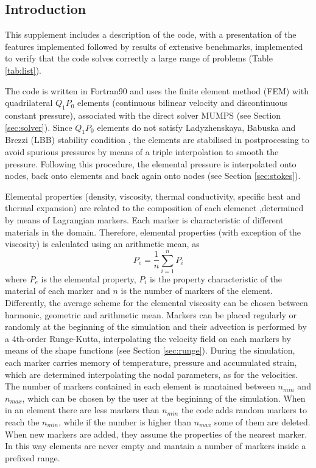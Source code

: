 \documentclass[draft,tec]{agutexSI2019}
\begin{document}
\begin{article}

\section{Introduction}\label{sec:intro}

This supplement includes a description of the code, with a presentation of the features implemented followed by results of extensive benchmarks, implemented to verify that the code solves correctly a large range of problems (Table \ref{tab:list}).

The code is written in Fortran90 and uses the finite element method (FEM) with quadrilateral $Q_1P_0$ elements (continuous bilinear velocity and discontinuous constant pressure), associated with the direct solver MUMPS (see Section \ref{sec:solver}). Since $Q_1P_0$ elements do not satisfy Ladyzhenskaya, Babuska and Brezzi (LBB) stability condition \cite{Donea2003}, the elements are stabilised in postprocessing to avoid spurious pressures by means of a triple interpolation to smooth the pressure. Following this procedure, the elemental pressure is interpolated onto nodes, back onto elements and back again onto nodes (see Section \ref{sec:stokes}).

Elemental properties (density, viscosity, thermal conductivity, specific heat and thermal expansion) are related to the composition of each elemenet ,determined by means of Lagrangian markers. Each marker is characteristic of different materials in the domain. Therefore, elemental properties (with exception of the viscosity) is calculated using an arithmetic mean, as \[P_e=\frac{1}{n}\sum_{i=1}^n P_i\]
where $P_e$ is the elemental property, $P_i$ is the property characteristic of the material of each marker and $n$ is the number of markers of the element. Differently, the average scheme for the elemental viscosity can be chosen between harmonic, geometric and arithmetic mean. Markers can be placed regularly or randomly at the beginning of the simulation and their advection is performed by a 4th-order Runge-Kutta, interpolating the velocity field on each markers by means of the shape functions (see Section \ref{sec:runge}). During the simulation, each marker carries memory of temperature, pressure and accumulated strain, which are determined interpolating the nodal parameters, as for the velocities. The number of markers contained in each element is mantained between $n_{min}$ and $n_{max}$, which can be chosen by the user at the begininng of the simulation. When in an element there are less markers than $n_{min}$ the code adds random markers to reach the $n_{min}$, while if the number is higher than $n_{max}$ some of them are deleted. When new markers are added, they assume the properties of the nearest marker. In this way elements are never empty and mantain a number of markers inside a prefixed range.


\end{article}
\end{document}
